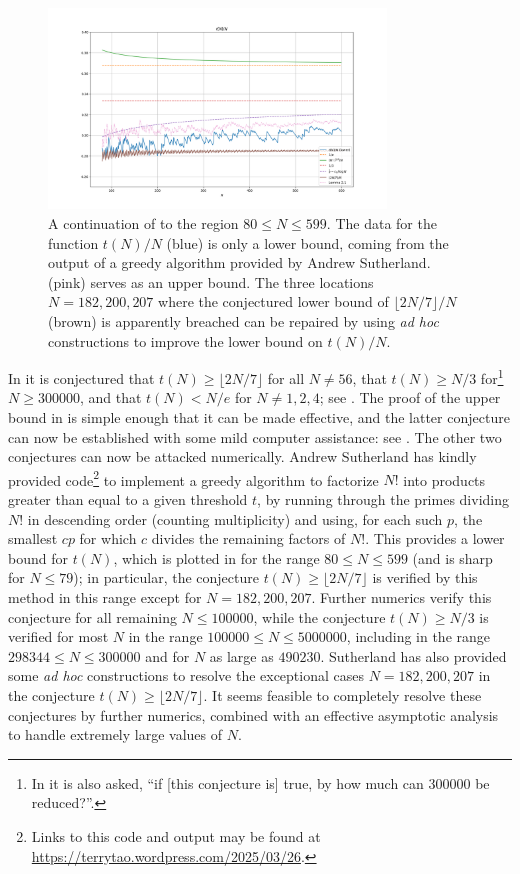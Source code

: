 \documentclass[12pt,a4paper,reqno]{amsart}
\numberwithin{equation}{section}
\theoremstyle{plain}
\theoremstyle{definition}
\begin{document}
\begin{figure}
  \centering
  \includegraphics[width=0.8\textwidth]{upperbound.png}
  \caption{A continuation of  to the region $80 \leq N \leq 599$.  The data for the function $t(N)/N$ (blue) is only a lower bound, coming from the output of a greedy algorithm provided by Andrew Sutherland.   (pink) serves as an upper bound. The three locations $N=182,200,207$ where the conjectured lower bound of $\lfloor 2N/7\rfloor/N$ (brown) is apparently breached can be repaired by using \emph{ad hoc} constructions to improve the lower bound on $t(N)/N$.}\label{fig1-alt}
  \end{figure}

In \cite{guy-selfridge} it is conjectured that $t(N) \geq \lfloor 2N/7\rfloor$ for all $N \neq 56$, that $t(N) \geq N/3$ for\footnote{In \cite{guy-selfridge} it is also asked, ``if [this conjecture is] true, by how much can $\num{300000}$ be reduced?''.} $N \geq \num{300000}$, and that $t(N) < N/e$ for $N \neq 1,2,4$; see .  The proof of the upper bound in  is simple enough that it can be made effective, and the latter conjecture can now be established with some mild computer assistance: see .  The other two conjectures can now be attacked numerically.  Andrew Sutherland has kindly provided code\footnote{Links to this code and output may be found at \url{https://terrytao.wordpress.com/2025/03/26}.} to implement a greedy algorithm to factorize $N!$ into products greater than equal to a given threshold $t$, by running through the primes dividing $N!$ in descending order (counting multiplicity) and using, for each such $p$, the smallest $cp$ for which $c$ divides the remaining factors of $N!$.  This provides a lower bound for $t(N)$, which is plotted in  for the range $80 \leq N \leq 599$ (and is sharp for $N \leq 79$); in particular, the conjecture $t(N) \geq \lfloor 2N/7 \rfloor$ is verified by this method in this range except for $N = 182, 200, 207$.  Further numerics verify this conjecture for all remaining $N \leq \num{100000}$, while the conjecture $t(N) \geq N/3$ is verified for most $N$ in the range $\num{100000} \leq N \leq \num{5000000}$, including in the range $\num{298344} \leq N \leq \num{300000}$ and for $N$ as large as $\num{490230}$.  Sutherland has also provided some \emph{ad hoc} constructions to resolve the exceptional cases $N = 182, 200, 207$ in the conjecture $t(N) \geq \lfloor 2N/7 \rfloor$.  It seems feasible to completely resolve these conjectures by further numerics, combined with an effective asymptotic analysis to handle extremely large values of $N$.
\end{document}
